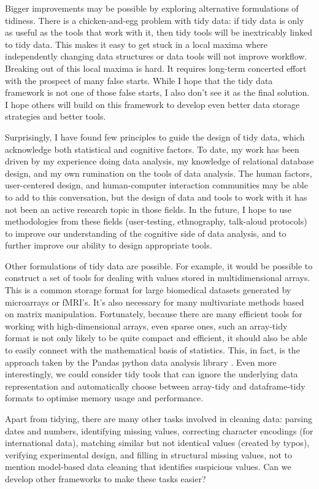 \documentclass[article]{jss}
\begin{document}
Bigger improvements may be possible by exploring alternative formulations of tidiness. There is a chicken-and-egg problem with tidy data: if tidy data is only as useful as the tools that work with it, then tidy tools will be inextricably linked to tidy data. This makes it easy to get stuck in a local maxima where independently changing data structures or data tools will not improve workflow. Breaking out of this local maxima is hard. It requires long-term concerted effort with the prospect of many false starts. While I hope that the tidy data framework is not one of those false starts, I also don't see it as the final solution. I hope others will build on this framework to develop even better data storage strategies and better tools.

Surprisingly, I have found few principles to guide the design of tidy data, which acknowledge both statistical and cognitive factors. To date, my work has been driven by my experience doing data analysis, my knowledge of relational database design, and my own rumination on the tools of data analysis. The human factors, user-centered design, and human-computer interaction communities may be able to add to this conversation, but the design of data and tools to work with it has not been an active research topic in those fields. In the future, I hope to use methodologies from these fields (user-testing, ethnography, talk-aloud protocols) to improve our understanding of the cognitive side of data analysis, and to further improve our ability to design appropriate tools.

Other formulations of tidy data are possible. For example, it would be possible to construct a set of tools for dealing with values stored in multidimensional arrays. This is a common storage format for large biomedical datasets generated by microarrays or fMRI's. It's also necessary for many multivariate methods based on matrix manipulation. Fortunately, because there are many efficient tools for working with high-dimensional arrays, even sparse ones, such an array-tidy format is not only likely to be quite compact and efficient, it should also be able to easily connect with the mathematical basis of statistics. This, in fact, is the approach taken by the Pandas python data analysis library \citep{mckinney:2010}. Even more interestingly, we could consider tidy tools that can ignore the underlying data representation and automatically choose between array-tidy and dataframe-tidy formats to optimise memory usage and performance.

Apart from tidying, there are many other tasks involved in cleaning data: parsing dates and numbers, identifying missing values, correcting character encodings (for international data), matching similar but not identical values (created by typos), verifying experimental design, and filling in structural missing values, not to mention model-based data cleaning that identifies suspicious values. Can we develop other frameworks to make these tasks easier?
\end{document}
